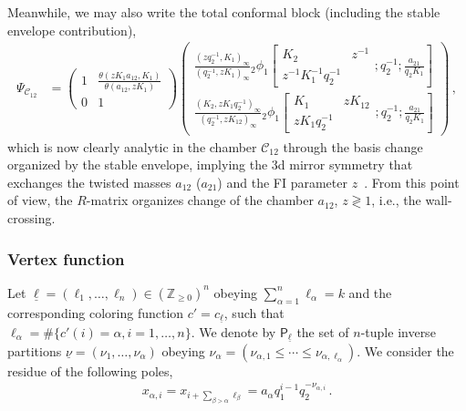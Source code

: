 Meanwhile, we may also write the total conformal block (including the stable envelope contribution),
\begin{align}
    \Psi_{\mathscr{C}_{12}}
    & =
    \begin{pmatrix}
        1 & \displaystyle \frac{\theta(z K_1 a_{12},K_1)}{\theta(a_{12},zK_1)} \\ 0 & 1
    \end{pmatrix}
    \begin{pmatrix}
        \displaystyle
        \frac{(z q_2^{-1}, K_1)_\infty}{(q_2^{-1}, z K_1)_\infty}
    {_2 \phi_1} \left[
    \begin{matrix}
        K_2 & z^{-1} \\ z^{-1} K_1^{-1} q_2^{-1}
    \end{matrix} ; q_2^{-1} ; \frac{a_{21}}{q_2 K_1}
    \right] \\[1.5em]
    \displaystyle
    \frac{(K_2,z K_1 q_2^{-1})_\infty}{(q_2^{-1},z K_{12})_\infty } {_2\phi_1}
    \left[
    \begin{matrix}
        K_1 & z K_{12} \\ z K_1 q_2^{-1} &
    \end{matrix}; q_2^{-1}; \frac{a_{21}}{q_2 K_1}
    \right] 
    \end{pmatrix}
    \, ,
\end{align}
which is now clearly analytic in the chamber ${\mathscr{C}_{12}}$ through the basis change organized by the stable envelope, implying the 3d mirror symmetry that exchanges the twisted masses $a_{12}$ ($a_{21}$) and the FI parameter $z$~\cite{Bullimore:2021rnr,Dedushenko:2021mds}.
From this point of view, the $R$-matrix organizes change of the chamber $a_{12}$, $z \gtrless 1$, i.e., the wall-crossing.


\subsubsection{Vertex function}\label{sec:vort_part_fn}

Let $\underline{\ell} = (\ell_1,\ldots,\ell_n) \in (\mathbb{Z}_{\ge 0})^n$ obeying $\sum_{\alpha=1}^n \ell_\alpha = k$ and the corresponding coloring function $c' = c_{\underline{\ell}}$, such that $\ell_\alpha = \#\{ c'(i) = \alpha, i = 1,\ldots,n \}$.
We denote by $\mathsf{P}_{\underline{\ell}}$ the set of $n$-tuple inverse partitions $\underline{\nu} = (\nu_1,\ldots,\nu_\alpha)$ obeying $\nu_\alpha = (\nu_{\alpha,1} \le \cdots \le \nu_{\alpha,\ell_\alpha})$.
We consider the residue of the following poles,
\begin{align}
    x_{\alpha,i} = x_{i + \sum_{\beta > \alpha} \ell_\beta} = a_\alpha q_1^{i-1} q_2^{-\nu_{\alpha,i}} \, .
    \label{eq:pole_ell}
\end{align}

